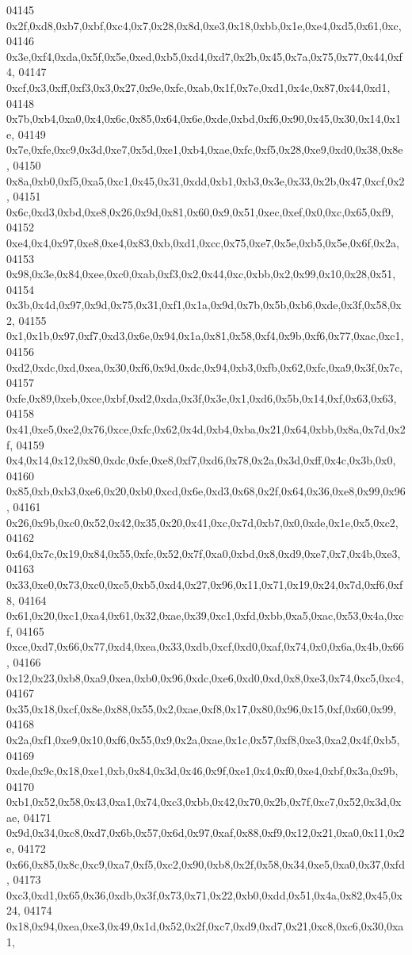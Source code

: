 \begin{DoxyCode}
04145   0x2f,0xd8,0xb7,0xbf,0xc4,0x7,0x28,0x8d,0xe3,0x18,0xbb,0x1e,0xe4,0xd5,0x61,0xc,
04146   0x3e,0xf4,0xda,0x5f,0x5e,0xed,0xb5,0xd4,0xd7,0x2b,0x45,0x7a,0x75,0x77,0x44,0xf4,
04147   0xcf,0x3,0xff,0xf3,0x3,0x27,0x9e,0xfc,0xab,0x1f,0x7e,0xd1,0x4c,0x87,0x44,0xd1,
04148   0x7b,0xb4,0xa0,0x4,0x6c,0x85,0x64,0x6e,0xde,0xbd,0xf6,0x90,0x45,0x30,0x14,0x1e,
04149   0x7e,0xfe,0xc9,0x3d,0xe7,0x5d,0xe1,0xb4,0xae,0xfc,0xf5,0x28,0xe9,0xd0,0x38,0x8e,
04150   0x8a,0xb0,0xf5,0xa5,0xc1,0x45,0x31,0xdd,0xb1,0xb3,0x3e,0x33,0x2b,0x47,0xcf,0x2,
04151   0x6c,0xd3,0xbd,0xe8,0x26,0x9d,0x81,0x60,0x9,0x51,0xec,0xef,0x0,0xc,0x65,0xf9,
04152   0xe4,0x4,0x97,0xe8,0xe4,0x83,0xb,0xd1,0xcc,0x75,0xe7,0x5e,0xb5,0x5e,0x6f,0x2a,
04153   0x98,0x3e,0x84,0xee,0xc0,0xab,0xf3,0x2,0x44,0xc,0xbb,0x2,0x99,0x10,0x28,0x51,
04154   0x3b,0x4d,0x97,0x9d,0x75,0x31,0xf1,0x1a,0x9d,0x7b,0x5b,0xb6,0xde,0x3f,0x58,0x2,
04155   0x1,0x1b,0x97,0xf7,0xd3,0x6e,0x94,0x1a,0x81,0x58,0xf4,0x9b,0xf6,0x77,0xac,0xc1,
04156   0xd2,0xdc,0xd,0xea,0x30,0xf6,0x9d,0xdc,0x94,0xb3,0xfb,0x62,0xfc,0xa9,0x3f,0x7c,
04157   0xfe,0x89,0xeb,0xce,0xbf,0xd2,0xda,0x3f,0x3e,0x1,0xd6,0x5b,0x14,0xf,0x63,0x63,
04158   0x41,0xe5,0xe2,0x76,0xce,0xfc,0x62,0x4d,0xb4,0xba,0x21,0x64,0xbb,0x8a,0x7d,0x2f,
04159   0x4,0x14,0x12,0x80,0xdc,0xfe,0xe8,0xf7,0xd6,0x78,0x2a,0x3d,0xff,0x4c,0x3b,0x0,
04160   0x85,0xb,0xb3,0xe6,0x20,0xb0,0xcd,0x6e,0xd3,0x68,0x2f,0x64,0x36,0xe8,0x99,0x96,
04161   0x26,0x9b,0xc0,0x52,0x42,0x35,0x20,0x41,0xc,0x7d,0xb7,0x0,0xde,0x1e,0x5,0xc2,
04162   0x64,0x7c,0x19,0x84,0x55,0xfc,0x52,0x7f,0xa0,0xbd,0x8,0xd9,0xe7,0x7,0x4b,0xe3,
04163   0x33,0xe0,0x73,0xc0,0xc5,0xb5,0xd4,0x27,0x96,0x11,0x71,0x19,0x24,0x7d,0xf6,0xf8,
04164   0x61,0x20,0xc1,0xa4,0x61,0x32,0xae,0x39,0xc1,0xfd,0xbb,0xa5,0xac,0x53,0x4a,0xcf,
04165   0xce,0xd7,0x66,0x77,0xd4,0xea,0x33,0xdb,0xcf,0xd0,0xaf,0x74,0x0,0x6a,0x4b,0x66,
04166   0x12,0x23,0xb8,0xa9,0xea,0xb0,0x96,0xdc,0xe6,0xd0,0xd,0x8,0xe3,0x74,0xc5,0xc4,
04167   0x35,0x18,0xcf,0x8e,0x88,0x55,0x2,0xae,0xf8,0x17,0x80,0x96,0x15,0xf,0x60,0x99,
04168   0x2a,0xf1,0xe9,0x10,0xf6,0x55,0x9,0x2a,0xae,0x1c,0x57,0xf8,0xe3,0xa2,0x4f,0xb5,
04169   0xde,0x9c,0x18,0xe1,0xb,0x84,0x3d,0x46,0x9f,0xe1,0x4,0xf0,0xe4,0xbf,0x3a,0x9b,
04170   0xb1,0x52,0x58,0x43,0xa1,0x74,0xc3,0xbb,0x42,0x70,0x2b,0x7f,0xc7,0x52,0x3d,0xae,
04171   0x9d,0x34,0xc8,0xd7,0x6b,0x57,0x6d,0x97,0xaf,0x88,0xf9,0x12,0x21,0xa0,0x11,0x2e,
04172   0x66,0x85,0x8c,0xc9,0xa7,0xf5,0xc2,0x90,0xb8,0x2f,0x58,0x34,0xe5,0xa0,0x37,0xfd,
04173   0xc3,0xd1,0x65,0x36,0xdb,0x3f,0x73,0x71,0x22,0xb0,0xdd,0x51,0x4a,0x82,0x45,0x24,
04174   0x18,0x94,0xea,0xe3,0x49,0x1d,0x52,0x2f,0xc7,0xd9,0xd7,0x21,0xc8,0xc6,0x30,0xa1,

\end{DoxyCode}
